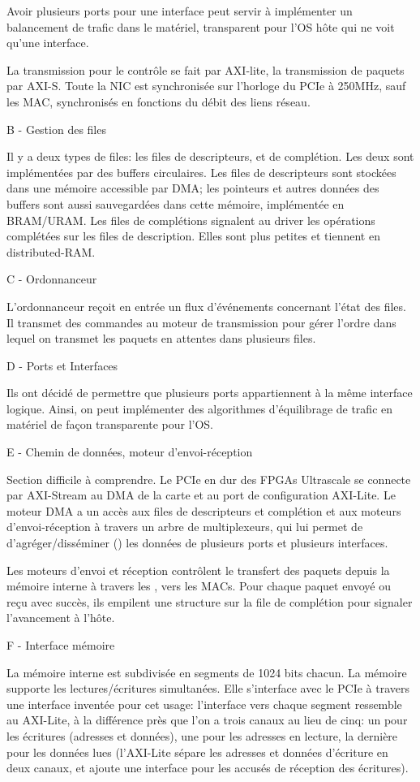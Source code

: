 Avoir plusieurs ports pour une interface peut servir à implémenter un balancement de trafic dans le matériel, transparent pour l'OS hôte qui ne voit qu'une interface.

La transmission pour le contrôle se fait par AXI-lite, la transmission de paquets par AXI-S. Toute la NIC est synchronisée sur l'horloge du PCIe à 250MHz, sauf les MAC, synchronisés en fonctions du débit des liens réseau.

B - Gestion des files

Il y a deux types de files: les files de descripteurs, et de complétion. Les deux sont implémentées par des buffers circulaires.
Les files de descripteurs sont stockées dans une mémoire accessible par DMA; les pointeurs et autres données des buffers sont aussi sauvegardées dans cette mémoire, implémentée en BRAM/URAM. Les files de complétions signalent au driver les opérations complétées sur les files de description. Elles sont plus petites et tiennent en distributed-RAM.

C - Ordonnanceur

L'ordonnanceur reçoit en entrée un flux d'événements concernant l'état des files. Il transmet des commandes au moteur de transmission pour gérer l'ordre dans lequel on transmet les paquets en attentes dans plusieurs files.

D - Ports et Interfaces

Ils ont décidé de permettre que plusieurs ports appartiennent à la même interface logique. Ainsi, on peut implémenter des algorithmes d'équilibrage de trafic en matériel de façon transparente pour l'OS.

E - Chemin de données, moteur d'envoi-réception

Section difficile à comprendre. Le PCIe en dur des FPGAs Ultrascale se connecte par AXI-Stream au DMA de la carte et au port de configuration AXI-Lite. Le moteur DMA a un accès aux files de descripteurs et complétion et aux moteurs d'envoi-réception à travers un arbre de multiplexeurs, qui lui permet de d'agréger/disséminer () les données de plusieurs ports et plusieurs interfaces.

Les moteurs d'envoi et réception contrôlent le transfert des paquets depuis la mémoire interne à travers les , vers les MACs. Pour chaque paquet envoyé ou reçu avec succès, ils empilent une structure sur la file de complétion pour signaler l'avancement à l'hôte.

F - Interface mémoire

La mémoire interne est subdivisée en segments de 1024 bits chacun. La mémoire supporte les lectures/écritures simultanées. Elle s'interface avec le PCIe à travers une interface inventée pour cet usage: l'interface vers chaque segment ressemble au AXI-Lite, à la différence près que l'on a trois canaux au lieu de cinq: un pour les écritures (adresses et données), une pour les adresses en lecture, la dernière pour les données lues (l'AXI-Lite sépare les adresses et données d'écriture en deux canaux, et ajoute une interface pour les accusés de réception des écritures).


